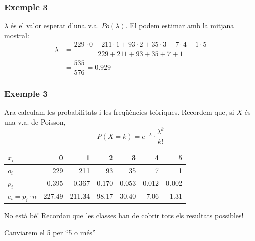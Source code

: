 \documentclass[12pt,t]{beamer}
\theoremstyle{plain}
\theoremstyle{definition}
\begin{document}
\begin{frame}
\frametitle{Exemple 3}
$\lambda$ és el valor esperat d'una v.a. $Po(\lambda)$. El podem estimar amb la mitjana mostral:
$$
\begin{array}{rl}
\lambda & =\dfrac{229\cdot 0+ 211\cdot 1+  93\cdot 2+ 35\cdot 3+7\cdot 4+ 1\cdot 5}{229+ 211+ 93 +35 + 7 + 1}\\[2ex]
 & =\dfrac{535}{576}=0.929
 \end{array}
$$

\end{frame}

\begin{frame}
\frametitle{Exemple 3}
Ara calculam les probabilitats i les freqüències teòriques. Recordem que, si $X$ és una v.a. de Poisson,
$$
P(X=k)=e^{-\lambda}\cdot \frac{\lambda^k}{k!}
$$
\begin{center}
\small \begin{tabular}{|l|rrrrrr|}
\hline
$x_i$ & 0 & 1 & 2 & 3 & 4 & 5 \\
\hline
$o_{i}$& 229 & 211 & 93 & 35 & 7 & 1 \\
\hline
$p_i$ &0.395 &  0.367  &0.170 & 0.053 & 0.012 & 0.002 \\ \hline
$e_i=p_i\cdot n$ &  227.49 & 211.34 & 98.17 & 30.40  & 7.06 &  1.31\\ \hline
\end{tabular}
\end{center}
\pause\medskip

No està bé! Recordau que les classes han de cobrir tots els resultats possibles!
\medskip

Canviarem el 5 per ``5 o més''




\end{frame}
\end{document}
